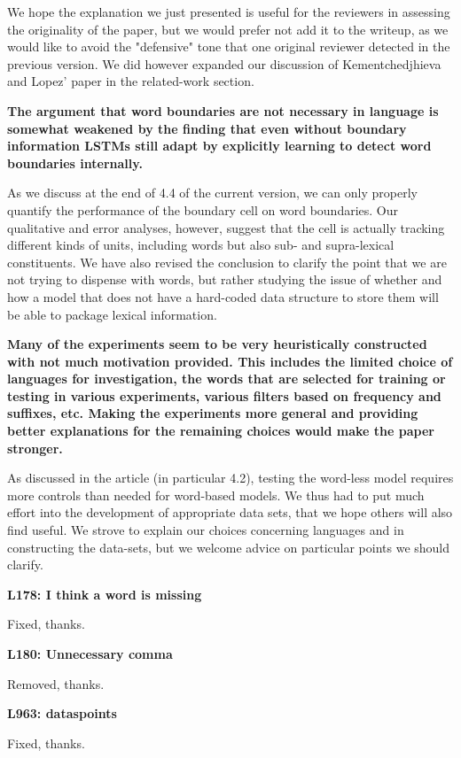 \documentclass{article}[11pt,a4paper,oneside]
\begin{document}
We hope the explanation we just presented is useful for the reviewers in assessing the originality of the paper, but we would prefer not add it to the writeup, as we would like to avoid the "defensive" tone that one original reviewer detected in the previous version. We did however expanded our discussion of Kementchedjhieva and Lopez' paper in the related-work section.\newline

\textbf{
The argument that word boundaries are not necessary in language is somewhat
weakened by the finding that even without boundary information LSTMs still
adapt by explicitly learning to detect word boundaries internally.}

As we discuss at the end of 4.4 of the current version, we can only properly quantify the performance of the boundary cell on word boundaries. Our qualitative and error analyses, however, suggest that the cell is actually tracking different kinds of units, including words but also sub- and supra-lexical constituents. We have also revised the conclusion to clarify the point that we are not trying to dispense with words, but rather studying the issue of whether and how a model that does not have a hard-coded data structure to store them will be able to package lexical information.\newline

\textbf{
Many of the experiments seem to be very heuristically constructed with not
much motivation provided. This includes the limited choice of languages for
investigation, the words that are selected for training or testing in
various experiments, various filters based on frequency and suffixes, etc.
Making the experiments more general and providing better explanations for
the remaining choices would make the paper stronger.}

As discussed in the article (in particular 4.2), testing the word-less model requires more controls than needed for word-based models. We thus had to put much effort into the development of appropriate data sets, that we hope others will also find useful. We strove to explain our choices concerning languages and in constructing the data-sets, but we welcome advice on particular points we should clarify.\newline

\textbf{
L178: I think a word is missing}

Fixed, thanks.\newline

\textbf{
L180: Unnecessary comma}

Removed, thanks.\newline

\textbf{
L963: dataspoints}

Fixed, thanks.
\end{document}
